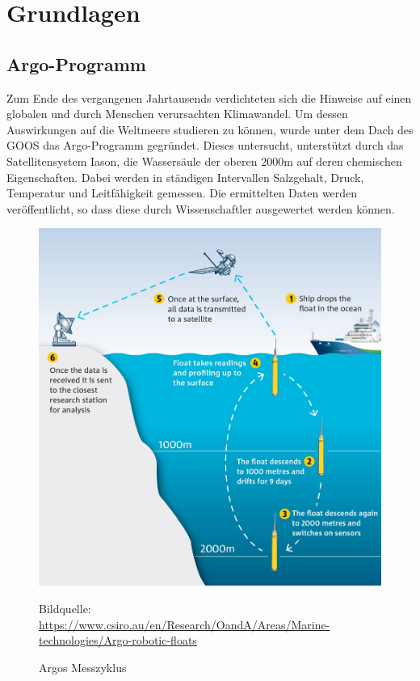 \section{Grundlagen}




    \subsection{Argo-Programm}


    Zum Ende des vergangenen Jahrtausends verdichteten sich die Hinweise auf einen globalen und durch Menschen verursachten Klimawandel. Um dessen Auswirkungen auf die Weltmeere studieren zu können, wurde unter dem Dach des \gls{GOOS} das Argo-Programm gegründet. Dieses untersucht, unterstützt durch das Satellitensystem Iason, die Wassersäule der oberen 2000m auf deren chemischen Eigenschaften. Dabei werden in ständigen Intervallen Salzgehalt, Druck, Temperatur und Leitfähigkeit gemessen. Die ermittelten Daten werden veröffentlicht, so dass diese durch Wissenschaftler ausgewertet werden können.


    \begin{figure}[h]
        \centering
        \includegraphics{pix/operation_park_profile.jpg}
        \caption[Argos Messzyklus]{Argos  Messzyklus}
        \footnotesize{
            Bildquelle: \url{https://www.csiro.au/en/Research/OandA/Areas/Marine-technologies/Argo-robotic-floats}
        }
        \label{fig:Argo-messzyklus}
    \end{figure}

